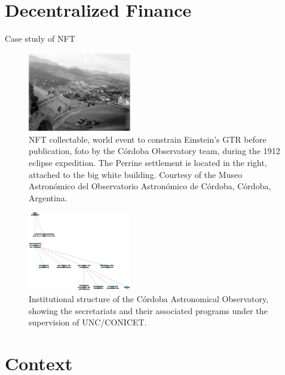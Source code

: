 \documentclass[final,5p,times,twocolumn,authoryear]{elsarticle}
\begin{document}
\section{Decentralized Finance} 

Case study of NFT
\begin{figure}[ht!]
    \centering
    \label{fig:my_label}
  \caption{NFT collectable, world event to constrain Einstein's GTR before publication, foto by the C\'ordoba Observatory team,
during the 1912 eclipse expedition. The Perrine settlement is located in the right, attached to the big white building. Courtesy of the Museo Astron\'omico del Observatorio Astron\'omico de C\'ordoba, C\'ordoba, Argentina.}
  \includegraphics[width=0.4\textwidth]{figs/p1912.eps}
\end{figure}

\begin{figure}[h]
    \centering
    \includegraphics[width=0.4\textwidth]{figs/institutional_structure_v2.eps}
    \caption{Institutional structure of the Córdoba Astronomical Observatory, showing the secretariats and their associated programs under the supervision of UNC/CONICET.}
    \label{fig:institutional_structure}
\end{figure}



\section{Context}
\label{section:context}
%
\end{document}
